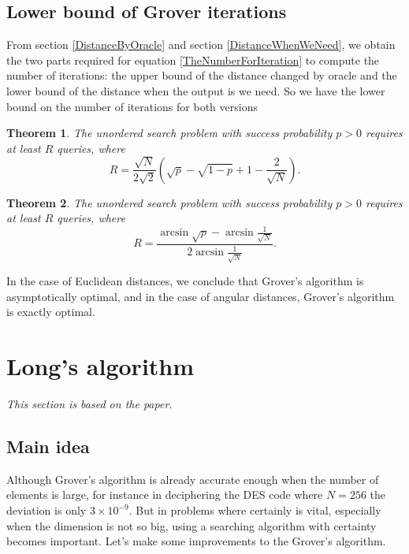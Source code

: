 \documentclass[a4paper,10pt]{book}
\newtheorem{theorem}{Theorem}[section]
\numberwithin{equation}{section}
\begin{document}
\section{Lower bound of Grover iterations}

From section \ref{DistanceByOracle} and section \ref{DistanceWhenWeNeed}, we obtain the two parts required for equation \ref{TheNumberForIteration} to compute the number of iterations: the upper bound of the distance changed by oracle and the lower bound of the distance when the output is we need. So we have the lower bound on the number of iterations for both versions
\begin{theorem}
    The unordered search problem with success probability $p>0$ requires at least $R$ queries, where
    \begin{equation}
        R =\frac{\sqrt{N}}{2\sqrt{2}}\left(\sqrt{p}-\sqrt{1-p}+1-\frac{2}{\sqrt{N}}\right).
    \end{equation}
\end{theorem}
\begin{theorem}
    The unordered search problem with success probability $p>0$ requires at least $R$ queries, where
    \begin{equation}
        R =\frac{\arcsin\sqrt{p}-\arcsin\frac{1}{\sqrt{N}}}{2\arcsin\frac{1}{\sqrt{N}}}.
    \end{equation}
\end{theorem}
In the case of Euclidean distances, we conclude that Grover's algorithm is asymptotically optimal, and in the case of angular distances, Grover's algorithm is exactly optimal.



\chapter{Long's algorithm}

\textit{This section is based on the paper\cite{Long_2001}.}

\section{\label{subsec:LongMainIdea}Main idea}

Although Grover's algorithm is already accurate enough when the number of elements is large, for instance in deciphering the DES code where $N = 256$ the deviation is only $3\times 10^{-9}$. But in problems where certainly is vital, especially when the dimension is not so big, using a searching algorithm with certainty becomes important. Let's make some improvements to the Grover's algorithm.
\end{document}
